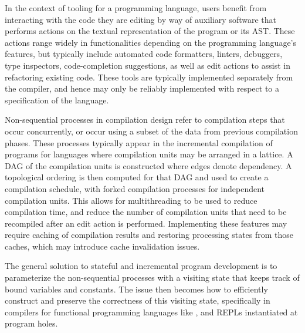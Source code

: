 In the context of tooling for a programming language, users benefit from interacting with the code they are editing by way of auxiliary software that performs actions on the textual representation of the program or its \ac{AST}.
These actions range widely in functionalities depending on the programming language's features, but typically include automated code formatters, linters, debuggers, type inspectors, code-completion suggestions, as well as edit actions to assist in refactoring existing code.
These tools are typically implemented separately from the compiler, and hence may only be reliably implemented with respect to a specification of the language.


Non-sequential processes in compilation design refer to compilation steps that occur concurrently, or occur using a subset of the data from previous compilation phases.
These processes typically appear in the incremental compilation of programs for languages where compilation units may be arranged in a lattice.
A \ac{DAG} of the compilation units is constructed where edges denote dependency.
A topological ordering is then computed for that \ac{DAG} and used to create a compilation schedule, with forked compilation processes for independent compilation units.
This allows for multithreading to be used to reduce compilation time, and reduce the number of compilation units that need to be recompiled after an edit action is performed.
Implementing these features may require caching of compilation results and restoring processing states from those caches, which may introduce cache invalidation issues.

The general solution to stateful and incremental program development is to parameterize the non-sequential processes with a visiting state that keeps track of bound variables and constants.
The issue then becomes how to efficiently construct and preserve the correctness of this visiting state, specifically in compilers for functional programming languages like \Beluga, and \acp{REPL} instantiated at program holes.

